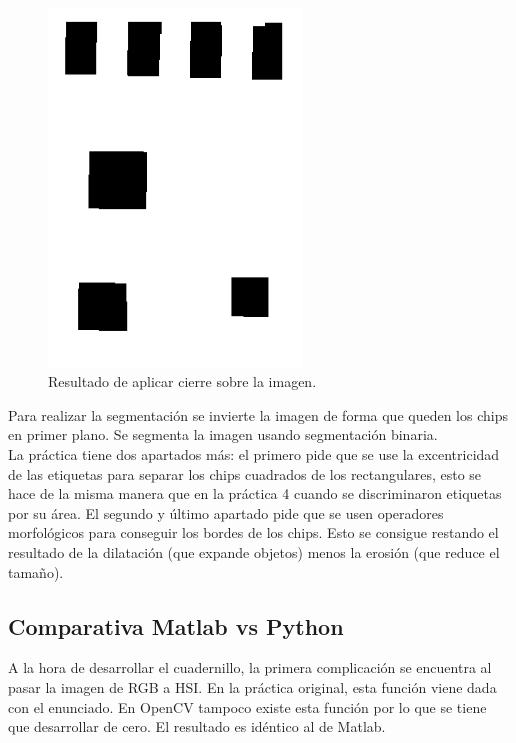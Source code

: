 \begin{figure}[h]
\centering
\includegraphics[width=0.6\textwidth]{imagenes/Closing}
\caption{Resultado de aplicar cierre sobre la imagen.}
\label{closing} 
\end{figure}

Para realizar la segmentación se invierte la imagen de forma que queden los chips en primer plano. Se segmenta la imagen usando segmentación binaria.\\

La práctica tiene dos apartados más: el primero pide que se use la excentricidad de las etiquetas para separar los chips cuadrados de los rectangulares, esto se hace de la misma manera que en la práctica 4 cuando se discriminaron etiquetas por su área. El segundo y último apartado pide que se usen operadores morfológicos para conseguir los bordes de los chips. Esto se consigue restando el resultado de la dilatación (que expande objetos) menos la erosión (que reduce el tamaño).\\

\subsection{Comparativa Matlab vs Python}

A la hora de desarrollar el cuadernillo, la primera complicación se encuentra al pasar la imagen de RGB a HSI. En la práctica original, esta función viene dada con el enunciado. En OpenCV tampoco existe esta función por lo que  se tiene que desarrollar de cero. El resultado es idéntico al de Matlab.\\


